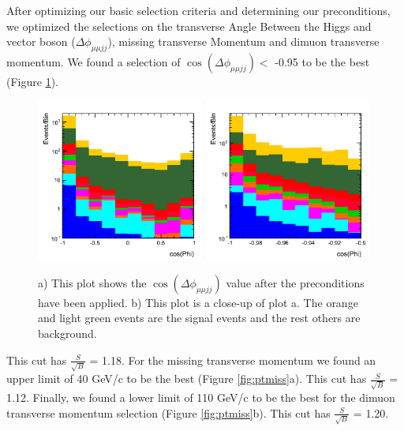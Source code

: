 \documentclass[12pt]{article}
\begin{document}
After optimizing our basic selection criteria and determining our preconditions, 
we optimized the selections on the transverse Angle Between the Higgs and vector boson ($\Delta\phi_{\mu\mu jj}$), missing transverse Momentum and dimuon transverse momentum. 
We found a selection of $\cos(\Delta\phi_{\mu\mu jj})<$ -0.95 to be the best (Figure \ref{fig:cosPhi}).
\begin{figure}[!hbtp]
\begin{center}
    \includegraphics[width=0.49\textwidth]{images/Hist_MuMu2JetPhiBeforeCuts.png} %
    \includegraphics[width=0.49\textwidth]{images/Hist_MuMu2JetPhiZoomB4Cut.png}
    \caption{ \label{fig:cosPhi}
         a) This plot shows the $\cos(\Delta\phi_{\mu\mu jj})$ value after the preconditions have been applied. b) This plot is a close-up of plot a.
	 The orange and light green events are the signal events and the rest others are background.
      }
\end{center}
\end{figure} 
This cut has $\frac{S}{\sqrt{B}}$ = 1.18. For the missing transverse momentum we found an upper limit of 40 GeV/c to be the best (Figure \ref{fig:ptmiss}a).
This cut has $\frac{S}{\sqrt{B}}$ = 1.12. Finally, we found a lower limit of 110 GeV/c to be the best for the dimuon transverse momentum selection 
(Figure \ref{fig:ptmiss}b). This cut has $\frac{S}{\sqrt{B}}$ = 1.20. 
\end{document}
